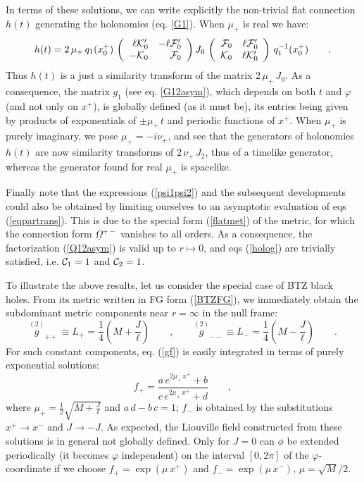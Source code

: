 \documentclass[a4paper,10pt]{article}
\begin{document}
In terms of these solutions,
we can write explicitly the
non-trivial flat connection $h(t)$ generating the holonomies (eq. \ref{G1}). 
When $\mu_+$ is real we have:
\begin{equation}
h(t)= 2\, {\mu_+}  \, q_1(x^+_0)\, \left(\begin{array}{rr}
\ell{\cal K}'_0&-\ell {\cal F}'_0 \\
-{\cal K}_0&{\cal F}_0
\end{array}\right)J_0\, \left(\begin{array}{rr}
{\cal F}_0&\ell {\cal F}'_0\\
{\cal K}_0& \ell {\cal K}'_0
\end{array}\right)\,q_1^{-1}(x^+_0) \qquad .
\end{equation}
Thus $h(t)$ is a just a similarity transform of the 
matrix $2\, \mu_+ \, J_0$.
As a consequence, the matrix $g_1$ (see eq. \ref{G12asym}), 
which depends on both $t$ and $\varphi$ (and not only on $x^+$),  
is globally defined (as it must be), its entries being given by
products of exponentials of $\pm \mu_+\, t$ and periodic functions of $x^+$.
When $\mu_+$ is purely imaginary, we pose $\mu_+= -i\nu_+$, 
and see that the generators of holonomies $h(t)$ are now
similarity transforms of $2\,\nu_+\, J_2$, thus of
a timelike generator, whereas
the generator found for real $\mu_+$  is spacelike.

Finally note that the expressions (\ref{psi1psi2}) and the
subsequent developments could also be obtained by
limiting ourselves to an asymptotic evaluation of eqs (\ref{eqpartrans}).
This is due to the special form (\ref{flatmet}) of the metric, for which the 
connection form $\underline {\Omega}^{+-}$ vanishes to all orders.
As a consequence, the factorization (\ref{Q12asym}) 
is valid up to $r\mapsto 0$, and eqs (\ref{holog}) are trivially satisfied,
i.e. ${\cal C}_1=1$  and ${\cal C}_2=1$.

To illustrate the above results, let us consider the special case of BTZ black 
holes. From its metric written in FG form (\ref{BTZFG}), 
we immediately obtain the subdominant metric 
components near $r=\infty$ in the null frame:
\begin{equation}
\stackrel {(2)} g_{++}\equiv L_+= \frac 1 4 (M + \frac J \ell)  \qquad , \qquad
\stackrel {(2)} g_{--}\equiv L_-= \frac 1 4 (M - \frac J \ell)  
\qquad .
\end{equation}
For such constant components, eq. (\ref{gf}) is easily
integrated in terms of purely exponential solutions:
\begin{equation}
\label{f1}
f_+ = \frac  {a\, e^{2 \mu _+ \, x^+}+b}
             {c\, e^{2 \mu _+ \, x^+}+d}
\qquad  ,
\end{equation}
where $\mu_+=\frac 1 2 \sqrt{M+ \frac J \ell}$
and $a\,d-b\,c=1$;
$f_- $  is obtained by the substitutions $x^+ \rightarrow x^-$
and $J \rightarrow -J$.
As expected, the Liouville field constructed from these solutions
is in general not globally defined. 
Only for $J=0$ can $\phi$ be extended periodically (it becomes
$\varphi$ independent)  on the interval
$[0, 2 \pi]$ of the $\varphi$-coordinate if we choose $f_+= \exp (\mu \,x^+)$ and
 $f_-= \exp (\mu \,x^-)$, $\mu =\sqrt{M}/2$.
\end{document}
